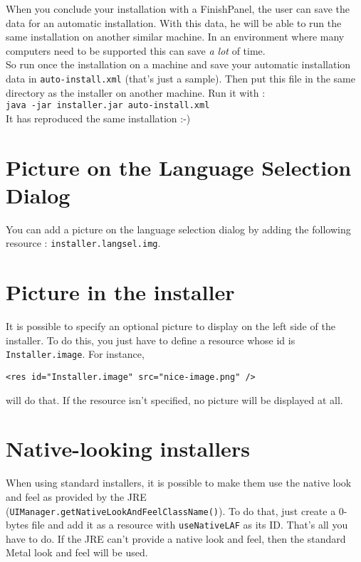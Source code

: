 When you conclude your installation with a FinishPanel, the user can
save the data for an automatic installation. With this data, he will be
able to run the same installation on another similar machine. In an
environment where many computers need to be supported this can save
\textsl{a lot} of time.\\

So run once the installation on a machine and save your automatic installation
data in \texttt{auto-install.xml} (that's just a sample). Then put this file in
the same directory as the installer on another machine. Run it with :\\
\texttt{java -jar installer.jar auto-install.xml}\\

It has reproduced the same installation :-)\\

\section{Picture on the Language Selection Dialog}

You can add a picture on the language selection dialog by adding the following
resource : \texttt{installer.langsel.img}.\\

\section{Picture in the installer}

It is possible to specify an optional picture to display on the left side of the
installer. To do this, you just have to define a resource whose id is
\texttt{Installer.image}. For instance,
\begin{verbatim}
<res id="Installer.image" src="nice-image.png" />
\end{verbatim}
will do that. If the resource isn't specified, no picture will be displayed at
all.\\

\section{Native-looking installers}

When using standard installers, it is possible to make them use the native
look and feel as provided by the JRE
(\texttt{UIManager.getNativeLookAndFeelClassName()}). To do that, just create
a 0-bytes file and add it as a resource with \texttt{useNativeLAF} as its ID.
That's all you have to do. If the JRE can't provide a native look and feel, then
the standard Metal look and feel will be used.\\

